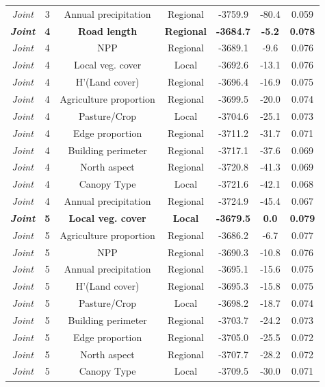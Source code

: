 \documentclass[preprint,final,times,12pt,3p]{elsarticle}
\begin{document}
\begin{longtable}{ c c c c c c c}
	\emph{Joint} & 3 & Annual precipitation & Regional & -3759.9 & -80.4 & 0.059 \\
	\textbf{\emph{Joint}} & \textbf{4} & \textbf{Road length} & \textbf{Regional} & \textbf{-3684.7} & \textbf{-5.2} & \textbf{0.078} \\
	\emph{Joint} & 4 & NPP & Regional & -3689.1 & -9.6 & 0.076 \\
	\emph{Joint} & 4 & Local veg. cover & Local & -3692.6 & -13.1 & 0.076 \\
	\emph{Joint} & 4 & H'(Land cover) & Regional & -3696.4 & -16.9 & 0.075 \\
	\emph{Joint} & 4 & Agriculture proportion & Regional & -3699.5 & -20.0 & 0.074 \\
	\emph{Joint} & 4 & Pasture/Crop & Local & -3704.6 & -25.1 & 0.073 \\
	\emph{Joint} & 4 & Edge proportion & Regional & -3711.2 & -31.7 & 0.071 \\
	\emph{Joint} & 4 & Building perimeter & Regional & -3717.1 & -37.6 & 0.069 \\
	\emph{Joint} & 4 & North aspect & Regional & -3720.8 & -41.3 & 0.069 \\
	\emph{Joint} & 4 & Canopy Type & Local & -3721.6 & -42.1 & 0.068 \\
	\emph{Joint} & 4 & Annual precipitation & Regional & -3724.9 & -45.4 & 0.067 \\
	\textbf{\emph{Joint}} & \textbf{5} & \textbf{Local veg. cover} & \textbf{Local} & \textbf{-3679.5} & \textbf{0.0} & \textbf{0.079} \\
	\emph{Joint} & 5 & Agriculture proportion & Regional & -3686.2 & -6.7 & 0.077 \\
	\emph{Joint} & 5 & NPP & Regional & -3690.3 & -10.8 & 0.076 \\
	\emph{Joint} & 5 & Annual precipitation & Regional & -3695.1 & -15.6 & 0.075 \\
	\emph{Joint} & 5 & H'(Land cover) & Regional & -3695.3 & -15.8 & 0.075 \\
	\emph{Joint} & 5 & Pasture/Crop & Local & -3698.2 & -18.7 & 0.074 \\
	\emph{Joint} & 5 & Building perimeter & Regional & -3703.7 & -24.2 & 0.073 \\
	\emph{Joint} & 5 & Edge proportion & Regional & -3705.0 & -25.5 & 0.072 \\
	\emph{Joint} & 5 & North aspect & Regional & -3707.7 & -28.2 & 0.072 \\
	\emph{Joint} & 5 & Canopy Type & Local & -3709.5 & -30.0 & 0.071 \\

\end{longtable}
\end{document}
